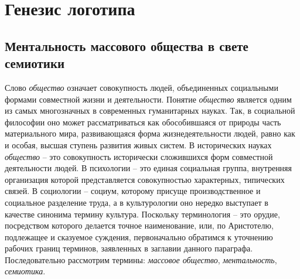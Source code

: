 \section{Генезис логотипа}

\subsection{Ментальность массового общества в свете семиотики}\label{1}
Слово \emph{общество} означает совокупность людей, объединенных социальными формами
совместной жизни и деятельности. Понятие \emph{общество} является одним из самых многозначных в
современных гуманитарных науках. Так, в социальной философии оно может рассматриваться как обособившаяся
от природы часть материального мира, развивающаяся форма жизнедеятельности людей,
равно как и особая, высшая ступень развития живых систем. В исторических науках \emph{общество}
-- это совокупность исторически сложившихся форм совместной деятельности людей.
В психологии -- это единая социальная группа, внутренняя организация которой представляется
совокупностью характерных, типических связей. В социологии -- социум, которому присуще
производственное и социальное разделение труда, а в культурологии оно нередко выступает в
качестве синонима термину культура. Поскольку терминология -- это орудие, посредством
которого делается точное наименование, или, по Аристотелю, подлежащее и сказуемое суждения,
первоначально обратимся к уточнению рабочих границ терминов, заявленных в заглавии данного
параграфа. Последовательно рассмотрим термины: \emph{массовое общество}, \emph{ментальность},
\emph{семиотика}.\autocite{society}



